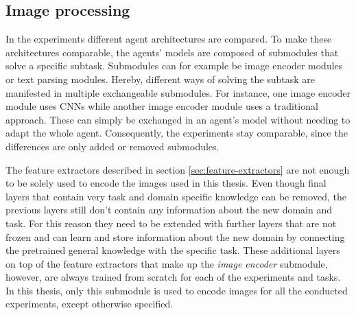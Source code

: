 
\subsection{Image processing}
\label{sec:image-processing}
In the experiments different agent architectures are compared.
To make these architectures comparable, the agents' models are composed of submodules that solve a specific subtask.
Submodules can for example be image encoder modules or text parsing modules.
Hereby, different ways of solving the subtask are manifested in multiple exchangeable submodules.
For instance, one image encoder module uses CNNs while another image encoder module uses a traditional approach.
These can simply be exchanged in an agent's model without needing to adapt the whole agent.
Consequently, the experiments stay comparable, since the differences are only added or removed submodules.

The feature extractors described in section \ref{sec:feature-extractors} are not enough to be solely used to encode the images used in this thesis.
Even though final layers that contain very task and domain specific knowledge can be removed, the previous layers still don't contain any information about the new domain and task.
For this reason they need to be extended with further layers that are not frozen and can learn and store information about the new domain by connecting the pretrained general knowledge with the specific task.
These additional layers on top of the feature extractors that make up the \emph{image encoder} submodule, however, are always trained from scratch for each of the experiments and tasks.
In this thesis, only this submodule is used to encode images for all the conducted experiments, except otherwise specified.

